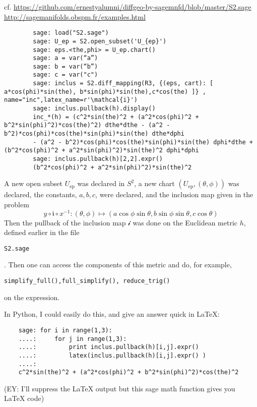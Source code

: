 \documentclass[10pt]{amsart}
\begin{document}
\begin{multicols*}{2}
	cf. \url{https://github.com/ernestyalumni/diffgeo-by-sagemnfd/blob/master/S2.sage} \\
	\url{http://sagemanifolds.obspm.fr/examples.html}
	
	{\scriptsize \begin{verbatim}
		sage: load("S2.sage")
		sage: U_ep = S2.open_subset('U_{ep}')
		sage: eps.<the,phi> = U_ep.chart()
		sage: a = var(“a”)
		sage: b = var(“b”)
		sage: c = var("c")
		sage: inclus = S2.diff_mapping(R3, {(eps, cart): [ a*cos(phi)*sin(the), b*sin(phi)*sin(the),c*cos(the) ]} , name="inc",latex_name=r'\mathcal{i}')
		sage: inclus.pullback(h).display()
		inc_*(h) = (c^2*sin(the)^2 + (a^2*cos(phi)^2 + b^2*sin(phi)^2)*cos(the)^2) dthe*dthe - (a^2 - b^2)*cos(phi)*cos(the)*sin(phi)*sin(the) dthe*dphi 
		- (a^2 - b^2)*cos(phi)*cos(the)*sin(phi)*sin(the) dphi*dthe + (b^2*cos(phi)^2 + a^2*sin(phi)^2)*sin(the)^2 dphi*dphi
		sage: inclus.pullback(h)[2,2].expr()
		(b^2*cos(phi)^2 + a^2*sin(phi)^2)*sin(the)^2
		\end{verbatim}
	}
	A new open subset $U_{\text{ep}}$ was declared in $S^2$, a new chart $(U_{\text{ep}}, (\theta,\phi))$ was declared, the constants, $a,b,c$, were declared, and the inclusion map given in the problem
	\[
	y\circ \mathfrak{i} \circ x^{-1} : (\theta, \phi) \mapsto ( a\cos{\phi} \sin{\theta}, b \sin{\phi} \sin{\theta}, c\cos{\theta})
	\]
	Then the pullback of the inclusion map $\mathcal{i}$ was done on the Euclidean metric $h$, defined earlier in the file \begin{verbatim}S2.sage\end{verbatim}.  Then one can access the components of this metric and do, for example, \begin{verbatim}simplify_full(),full_simplify(), reduce_trig()\end{verbatim} on the expression.  
	
	In Python, I could easily do this, and give an answer quick in LaTeX:
	
	\begin{verbatim}
	sage: for i in range(1,3): 
	....:     for j in range(1,3):
	....:         print inclus.pullback(h)[i,j].expr()
	....:         latex(inclus.pullback(h)[i,j].expr() )
	....:         
	c^2*sin(the)^2 + (a^2*cos(phi)^2 + b^2*sin(phi)^2)*cos(the)^2
	\end{verbatim}
	(EY: I'll suppress the LaTeX output but this sage math function gives you LaTeX code)
	

\end{multicols*}
\end{document}
